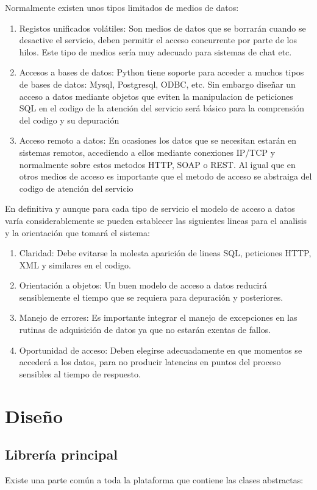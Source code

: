 \documentclass[a4paper,spanish,12pt]{book}
\begin{document}
Normalmente existen unos tipos limitados de medios de datos:
\begin{enumerate}
	\item{Registos unificados volátiles: Son medios de datos que se borrarán cuando se desactive el servicio, deben permitir el acceso concurrente por parte de los hilos. Este tipo de medios sería muy adecuado para sistemas de chat etc.}
	\item{Accesos a bases de datos: Python tiene soporte para acceder a muchos tipos de bases de datos: Mysql, Postgresql, ODBC, etc. Sin embargo diseñar un acceso a datos mediante objetos que eviten la manipulacion de peticiones SQL en el codigo de la atención del servicio será básico para la comprensión del codigo y su depuración}
	\item{Acceso remoto a datos: En ocasiones los datos que se necesitan estarán en sistemas remotos, accediendo a ellos mediante conexiones IP/TCP y normalmente sobre estos metodos HTTP, SOAP o REST. Al igual que en otros medios de acceso es importante que el metodo de acceso se abstraiga del codigo de atención del servicio}
\end{enumerate}
En definitiva y aunque para cada tipo de servicio el modelo de acceso a datos varía considerablemente se pueden establecer las siguientes lineas para el analisis y la orientación que tomará el sistema:
\begin{enumerate}
	\item{Claridad: Debe evitarse la molesta aparición de lineas SQL, peticiones HTTP, XML y similares en el codigo.}
	\item{Orientación a objetos: Un buen modelo de acceso a datos reducirá sensiblemente el tiempo que se requiera para depuración y posteriores.}
	\item{Manejo de errores: Es importante integrar el manejo de excepciones en las rutinas de adquisición de datos ya que no estarán exentas de fallos.}
	\item{Oportunidad de acceso: Deben elegirse adecuadamente en que momentos se accederá a los datos, para no producir latencias en puntos del proceso sensibles al tiempo de respuesto.}
\end{enumerate}

\section{Diseño}

\subsection{Librería principal}
Existe una parte común a toda la plataforma que contiene las clases abstractas:
\end{document}
